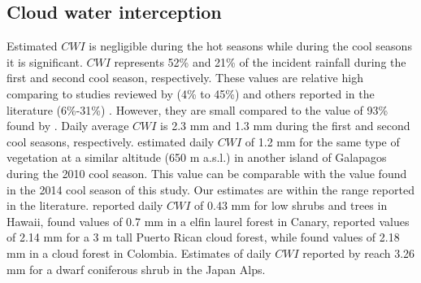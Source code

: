 \documentclass[a4paper,12pt]{article}
\begin{document}
\begin{linenumbers}
\subsection{Cloud water interception}
Estimated $CWI$ is negligible during the hot seasons while during the cool seasons it is significant. $CWI$ represents 52\% and 21\% of the incident rainfall during the first and second cool season, respectively. These values are relative high comparing to studies reviewed by \cite{Bruijnzeeletal2011} (4\% to 45\%) and others reported in the literature (6\%-31\%) \citep{Hutleyetal1997, Holwerdaetal2006, McJannetetal2007a, Holwerdaetal2010, Ueharaetal2012}. However, they are small compared to the value of 93\% found by \cite{CavalierandGoldstein1989}. Daily average $CWI$ is 2.3 mm and 1.3 mm during the first and second cool seasons, respectively. \cite{Pryetetal2012a} estimated daily $CWI$ of 1.2 mm for the same type of vegetation at a similar altitude (650 m a.s.l.) in another island of Galapagos during the 2010 cool season. This value can be comparable with the value found in the 2014 cool season of this study. Our estimates are within the range reported in the literature. \cite{Giambellucaetal2011} reported daily $CWI$ of 0.43 mm for low shrubs and trees in Hawaii, \cite{Ritteretal2008} found values of 0.7 mm in a elfin laurel forest in Canary, \cite{Holwerdaetal2006} reported values of 2.14 mm for a 3 m tall Puerto Rican cloud forest, while \cite{CavalierandGoldstein1989} found values of 2.18 mm in a cloud forest in Colombia. Estimates of daily $CWI$ reported by \cite{Ueharaetal2012} reach 3.26 mm for a dwarf coniferous shrub in the Japan Alps.


\end{linenumbers}
\end{document}
